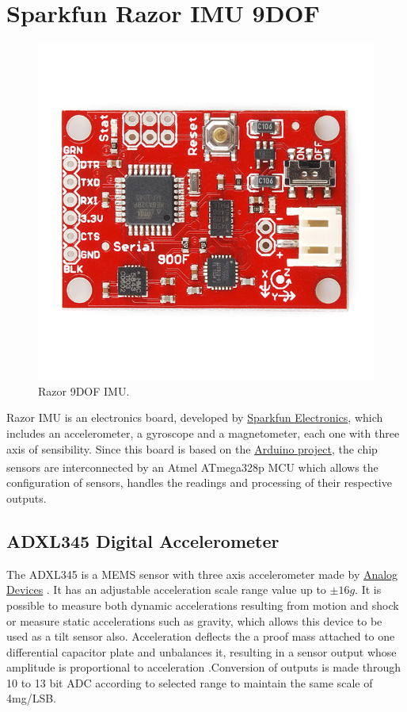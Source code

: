 \section{Sparkfun Razor IMU 9DOF} \label{section:sparkfun}

\begin{figure}[!htb]
	\centering
	\includegraphics[width=0.5\linewidth]{figures/10125-04b.jpg}
	\caption[Razor 9DOF IMU.]{Razor 9DOF IMU.}
	\label{fig:razor9dof}
\end{figure}

Razor IMU  is an electronics board, developed by
\href{http://www.sparkfun.com/}{Sparkfun Electronics}, which includes an
accelerometer, a gyroscope and a magnetometer, each one with three axis of
sensibility. Since this board is based on the
\href{https://www.arduino.cc/}{Arduino project}, the chip sensors are
interconnected by an Atmel\textsuperscript{\textregistered} ATmega328p \gls{MCU}
which allows the configuration of sensors, handles the readings and processing
of their respective outputs. 


\subsection{ADXL345 Digital Accelerometer} \label{subsection:adxl345}


The ADXL345 is a \gls{MEMS} sensor with three axis accelerometer made by
\href{http://http://www.analog.com/en/index.html}{Analog Devices} . It has an
adjustable acceleration scale range value up to $\pm16g$. It is possible to
measure both dynamic accelerations resulting from motion and shock or measure
static accelerations such as gravity, which allows this device to be used as a
tilt sensor also. Acceleration deflects the a proof mass attached to one differential capacitor plate and unbalances it, resulting in a sensor output whose amplitude is
proportional to acceleration \cite{adxl345_datasheet}.Conversion of outputs is made through 10 to 13 bit \gls{ADC} according to selected
range to maintain the same scale of 4mg/LSB. 


